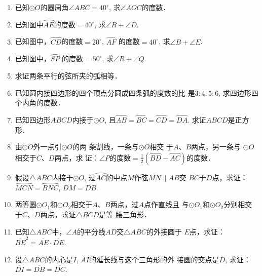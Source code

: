\begin{ex}
\begin{enumerate}
    \item 已知$\odot O$的圆周角$\angle ABC=40^{\circ}$, 求$\angle AOC$的度数．
    \item 已知图中$\wideparen{AE}$的度数$=40^{\circ}$, 求$\angle B+\angle D$.
    \item 已知图中，$\wideparen{CD}$的度数$=20^{\circ}$, $\wideparen{AF}$
    的度数$=40^{\circ}$, 求$\angle B+\angle E$.
    \item 已知图中，$\wideparen{SP}$
    的度数$=50^{\circ}$, 求$\angle R+\angle Q$.
    \item 求证两条平行的弦所夹的弧相等．
    \item 已知圆内接四边形的四个顶点分圆成四条弧的度数的比
    是$3:4:5:6$, 求四边形四个内角的度数．
    \item 已知四边形$ABCD$内接于$\odot O$, 且$\wideparen{AB}=\wideparen{BC}=\wideparen{CD}=\wideparen{DA}$.
    求证$ABCD$是正方形．
\item 由$\odot O$外一点引$\odot O$的两
条割线，一条与$\odot O$相交
于$A$、$B$两点，另一条与
$\odot O$相交于$C$、$D$两点，求
证：$\angle P$的度数$=\frac{1}{2}\left(\wideparen{BD}-\wideparen{AC}\right)$的度数．
\item 假设$\triangle ABC$内接于$\odot O$, 过$\wideparen{AC}$的中点$M$作弦$\overline{MN}\parallel AB$交
$\overline{BC}$于$D$点，求证：$\wideparen{MCN}=\wideparen{BNC}$, $\overline{DM}=\overline{DB}$.
\item 两等圆$\odot O_1$和$\odot O_2$相交于$A$、$B$两点，过$A$点作直线且
与$\odot O_1$和$\odot O_2$分别相交于$C$、$D$两点，求证$\triangle BCD$是等
腰三角形．
\item 已知$\triangle ABC$中，$\angle A$的平分线$AD$交$\triangle ABC$的外接圆于
$E$点，求证：$\overline{BE}^2=\overline{AE}\cdot \overline{DE}$.
\item 设$\triangle ABC$的内心是$I$, $\overline{AI}$的延长线与这个三角形的外
接圆的交点是$D$, 求证：$\overline{DI}=\overline{DB}=\overline{DC}$.
\end{enumerate}
\end{ex}

